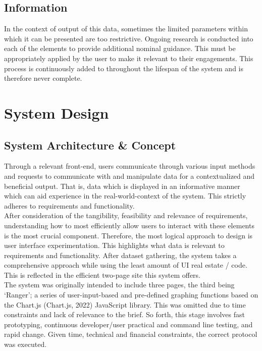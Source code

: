 \documentclass[11pt, english]{article}
\begin{document}
	\subsection{Information}

	In the context of output of this data, sometimes the limited parameters within which it can be presented are too restrictive. Ongoing research is conducted into each of the elements to provide additional nominal guidance. This must be appropriately applied by the user to make it relevant to their engagements. This process is continuously added to throughout the lifespan of the system and is therefore never complete.

\newpage

\section{System Design}\label{ch5}

	\subsection{System Architecture \& Concept}

	Through a relevant front-end, users communicate through various input methods and requests to communicate with and manipulate data for a contextualized and beneficial output. That is, data which is displayed in an informative manner which can aid experience in the real-world-context of the system. This strictly adheres to requirements and functionality.\\

	After consideration of the tangibility, feasibility and relevance of requirements, understanding how to most efficiently allow users to interact with these elements is the most crucial component. Therefore, the most logical approach to design is user interface experimentation. This highlights what data is relevant to requirements and functionality. After dataset gathering, the system takes a comprehensive approach while using the least amount of UI real estate / code. This is reflected in the efficient two-page site this system offers.\\

	The system was originally intended to include three pages, the third being `Ranger'; a series of user-input-based and pre-defined graphing functions based on the Chart.js (Chart.js, 2022) JavaScript library. This was omitted due to time constraints and lack of relevance to the brief. So forth, this stage involves fast prototyping, continuous developer/user practical and command line testing, and rapid change. Given time, technical and financial constraints, the correct protocol was executed.
\end{document}
